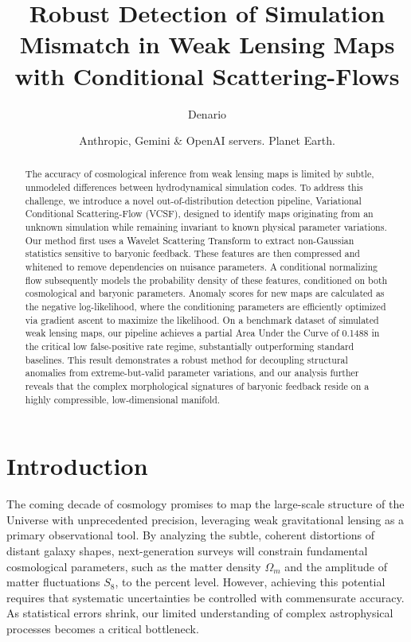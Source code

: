 \documentclass[]{article}
\begin{document}
\title{Robust Detection of Simulation Mismatch in Weak Lensing Maps with Conditional Scattering-Flows}

\author{Denario}
\date{Anthropic, Gemini \& OpenAI servers. Planet Earth.}

\maketitle
\begin{abstract}
The accuracy of cosmological inference from weak lensing maps is limited by subtle, unmodeled differences between hydrodynamical simulation codes. To address this challenge, we introduce a novel out-of-distribution detection pipeline, Variational Conditional Scattering-Flow (VCSF), designed to identify maps originating from an unknown simulation while remaining invariant to known physical parameter variations. Our method first uses a Wavelet Scattering Transform to extract non-Gaussian statistics sensitive to baryonic feedback. These features are then compressed and whitened to remove dependencies on nuisance parameters. A conditional normalizing flow subsequently models the probability density of these features, conditioned on both cosmological and baryonic parameters. Anomaly scores for new maps are calculated as the negative log-likelihood, where the conditioning parameters are efficiently optimized via gradient ascent to maximize the likelihood. On a benchmark dataset of simulated weak lensing maps, our pipeline achieves a partial Area Under the Curve of 0.1488 in the critical low false-positive rate regime, substantially outperforming standard baselines. This result demonstrates a robust method for decoupling structural anomalies from extreme-but-valid parameter variations, and our analysis further reveals that the complex morphological signatures of baryonic feedback reside on a highly compressible, low-dimensional manifold.
\end{abstract}








\section{Introduction}
\label{sec:intro}
The coming decade of cosmology promises to map the large-scale structure of the Universe with unprecedented precision, leveraging weak gravitational lensing as a primary observational tool. By analyzing the subtle, coherent distortions of distant galaxy shapes, next-generation surveys will constrain fundamental cosmological parameters, such as the matter density $\Omega_m$ and the amplitude of matter fluctuations $S_8$, to the percent level. However, achieving this potential requires that systematic uncertainties be controlled with commensurate accuracy. As statistical errors shrink, our limited understanding of complex astrophysical processes becomes a critical bottleneck.
\end{document}
